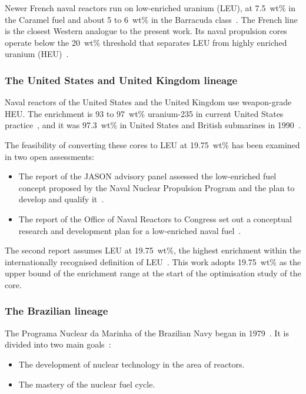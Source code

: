 Newer French naval reactors run
on low-enriched uranium (LEU), at 7.5~wt\% in the Caramel fuel and about
5 to 6~wt\% in the Barracuda class~\cite{wna_ships}. The French line is the closest Western analogue to the present work.
Its naval propulsion cores operate below the 20~wt\% threshold that
separates LEU from highly enriched uranium (HEU)~\cite{nrc_10cfr110_2}.

\subsubsection{The United States and United Kingdom lineage}
\label{subsec:lineage-us-uk}
Naval reactors of the United States and the United Kingdom use
weapon-grade HEU. The enrichment is 93 to 97~wt\% uranium-235 in current
United States practice~\cite{jason_2016}, and it was 97.3~wt\% in United
States and British submarines in 1990~\cite{ippolito_1990}.

The feasibility of converting these cores to LEU at 19.75~wt\% has been
examined in two open assessments:

\begin{itemize}
  \item The report of the JASON advisory panel assessed the low-enriched
        fuel concept proposed by the Naval Nuclear Propulsion Program and
        the plan to develop and qualify it~\cite{jason_2016}.

  \item The report of the Office of Naval Reactors to Congress set out a
        conceptual research and development plan for a low-enriched naval
        fuel~\cite{onr_leu_2016}.
\end{itemize}

The second report assumes LEU at 19.75~wt\%, the highest enrichment
within the internationally recognised definition of
LEU~\cite{onr_leu_2016}. This work adopts 19.75~wt\% as the upper bound
of the enrichment range at the start of the optimisation study of the
core.

\subsubsection{The Brazilian lineage}
\label{subsec:lineage-brazil}
The Programa Nuclear da Marinha of the Brazilian Navy began in
1979~\cite{vasconcelos_fapesp_2025}. It is divided into two main
goals~\cite{marinha_relatorio_gestao_2025}:

\begin{itemize}
  \item The development of nuclear technology in the area of reactors.

  \item The mastery of the nuclear fuel cycle.
\end{itemize}

